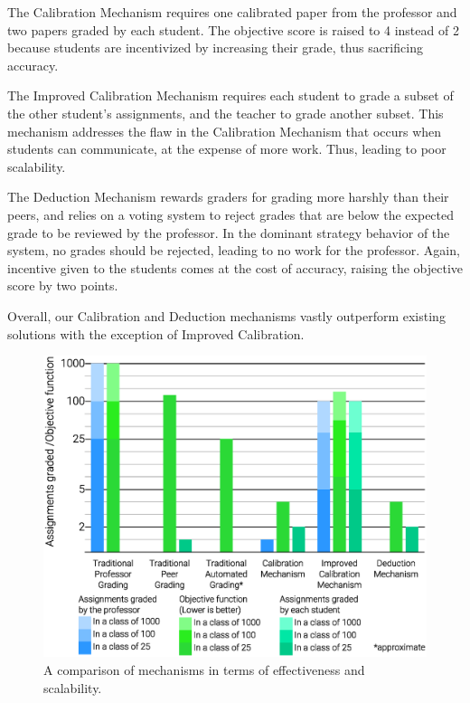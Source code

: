 \documentclass{chi-ext}
\begin{document}
The Calibration Mechanism requires one calibrated paper from the professor and two papers graded by each student. The objective score is raised to 4 instead of 2 because students are incentivized by increasing their grade, thus sacrificing accuracy.

The Improved Calibration Mechanism requires each student to grade a subset of the other student's assignments, and the teacher to grade another subset. This mechanism addresses the flaw in the Calibration Mechanism that occurs when students can communicate, at the expense of more work. Thus, leading to poor scalability.

The Deduction Mechanism rewards graders for grading more harshly than their peers, and relies on a voting system to reject grades that are below the expected grade to be reviewed by the professor. In the dominant strategy behavior of the system, no grades should be rejected, leading to no work for the professor. Again, incentive given to the students comes at the cost of accuracy, raising the objective score by two points.

Overall, our Calibration and Deduction mechanisms vastly outperform existing solutions with the exception of Improved Calibration.

\begin{figure}
  \centering
  \includegraphics[width=\linewidth]{Comparison-Graph.eps}
  \caption{A comparison of mechanisms in terms of effectiveness and scalability.}
  \label{fig:comparison}
\end{figure}
\end{document}
